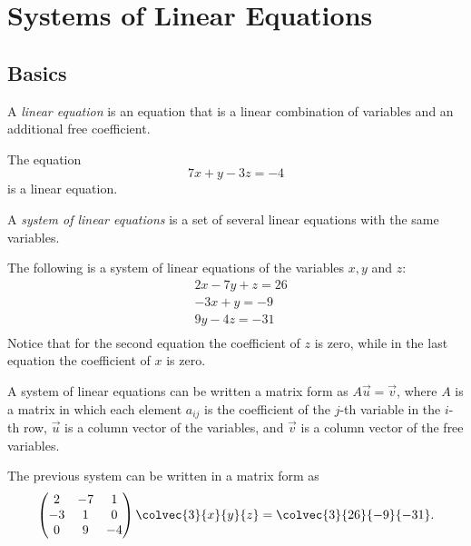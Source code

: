 \chapter{Systems of Linear Equations}
\section{Basics}
A \emph{linear equation} is an equation that is a linear combination of variables and an additional free coefficient.
\begin{example}
  The equation
  \begin{equation*}
  7x+y-3z=-4
  \end{equation*}
  is a linear equation.
\end{example}

A \emph{system of linear equations} is a set of several linear equations with the same variables.
\begin{example}
  The following is a system of linear equations of the variables $x, y$ and $z$:
  \begin{align*}
  &2x - 7y + z = 26\\
  &-3x + y = -9\\
  &9y - 4z = -31\\
  \end{align*}
  Notice that for the second equation the coefficient of $z$ is zero, while in the last equation the coefficient of $x$ is zero.
\end{example}

A system of linear equations can be written a matrix form as $A\vec{u}=\vec{v}$, where $A$ is a matrix in which each element $a_{ij}$ is the coefficient of the $j$-th variable in the $i$-th row, $\vec{u}$ is a column vector of the variables, and $\vec{v}$ is a column vector of the free variables.

\begin{example}
  The previous system can be written in a matrix form as
  \begin{equation*}
  \begin{pmatrix} 2 & -7 & 1\\ -3 & 1 & 0 \\ 0 & 9 & -4 \end{pmatrix}\colvec{3}{x}{y}{z} = \colvec{3}{26}{-9}{-31}.
  \end{equation*}
\end{example}

